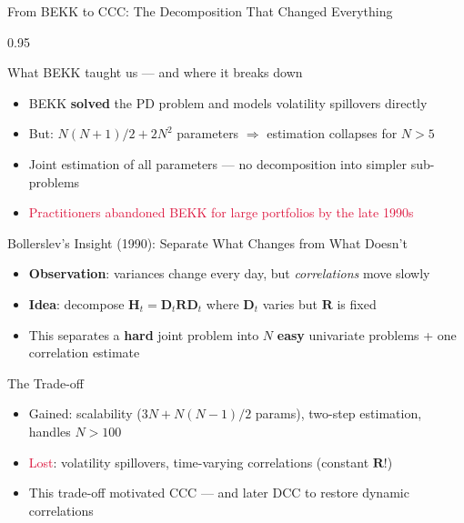 \documentclass[9pt, aspectratio=169, t]{beamer}
\begin{document}
\begin{frame}{From BEKK to CCC: The Decomposition That Changed Everything}
    \begin{cminipage}{0.95\textwidth}
    \vspace{-2mm}
    {\scriptsize
    \begin{block}{What BEKK taught us --- and where it breaks down}
        \begin{itemize}\setlength{\itemsep}{0pt}
            \item BEKK \textbf{solved} the PD problem and models volatility spillovers directly
            \item But: $N(N+1)/2 + 2N^2$ parameters $\Rightarrow$ estimation collapses for $N > 5$
            \item Joint estimation of all parameters --- no decomposition into simpler sub-problems
            \item \textcolor{Crimson}{Practitioners abandoned BEKK for large portfolios by the late 1990s}
        \end{itemize}
    \end{block}
    \vspace{-2mm}
    \begin{alertblock}{Bollerslev's Insight (1990): Separate What Changes from What Doesn't}
        \begin{itemize}\setlength{\itemsep}{0pt}
            \item \textbf{Observation}: variances change every day, but \textit{correlations} move slowly
            \item \textbf{Idea}: decompose $\mathbf{H}_t = \mathbf{D}_t \mathbf{R} \mathbf{D}_t$ where $\mathbf{D}_t$ varies but $\mathbf{R}$ is fixed
            \item This separates a \textbf{hard} joint problem into $N$ \textbf{easy} univariate problems + one correlation estimate
        \end{itemize}
    \end{alertblock}
    \vspace{-2mm}
    \begin{exampleblock}{The Trade-off}
        \begin{itemize}\setlength{\itemsep}{0pt}
            \item \textcolor{Forest}{Gained}: scalability ($3N + N(N-1)/2$ params), two-step estimation, handles $N > 100$
            \item \textcolor{Crimson}{Lost}: volatility spillovers, time-varying correlations (constant $\mathbf{R}$!)
            \item This trade-off motivated CCC --- and later DCC to restore dynamic correlations
        \end{itemize}
    \end{exampleblock}
    }
    \end{cminipage}
\end{frame}
\end{document}
